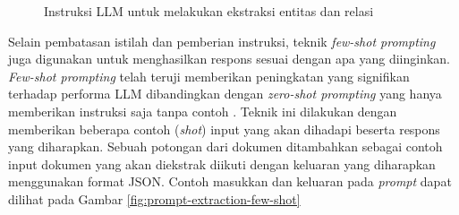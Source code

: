 \begin{figure}[H]
	\centering
	\caption{
		Instruksi LLM untuk melakukan ekstraksi entitas dan relasi
	}
	\label{fig:prompt-extraction-instruction}
\end{figure}

Selain pembatasan istilah dan pemberian instruksi, teknik \textit{few-shot prompting} juga digunakan untuk menghasilkan respons sesuai dengan apa yang diinginkan.
\textit{Few-shot prompting} telah teruji memberikan peningkatan yang signifikan terhadap performa LLM dibandingkan dengan \textit{zero-shot prompting} yang hanya memberikan instruksi saja tanpa contoh \cite{LLMisFewShot2020}.
Teknik ini dilakukan dengan memberikan beberapa contoh (\textit{shot}) input yang akan dihadapi beserta respons yang diharapkan.
Sebuah potongan dari dokumen ditambahkan sebagai contoh input dokumen yang akan diekstrak diikuti dengan keluaran yang diharapkan menggunakan format JSON.
Contoh masukkan dan keluaran pada \textit{prompt} dapat dilihat pada Gambar \ref{fig:prompt-extraction-few-shot}

